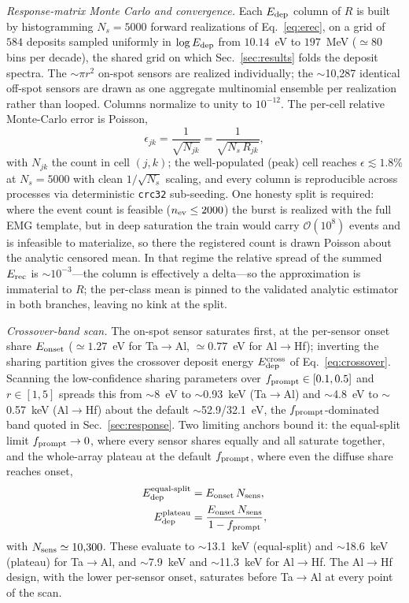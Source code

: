 \emph{Response-matrix Monte Carlo and convergence.} Each $E_{\rm dep}$ column of $R$ is built by histogramming $N_s=5000$ forward realizations of Eq.~\eqref{eq:erec}, on a grid of $584$ deposits sampled uniformly in $\log E_{\rm dep}$ from $10.14$~eV to $197$~MeV ($\simeq$80 bins per decade), the shared grid on which Sec.~\ref{sec:results} folds the deposit spectra. The $\sim\pi r^2$ on-spot sensors are realized individually; the $\sim$10,287 identical off-spot sensors are drawn as one aggregate multinomial ensemble per realization rather than looped. Columns normalize to unity to $10^{-12}$. The per-cell relative Monte-Carlo error is Poisson,
\begin{equation}
\epsilon_{jk}=\frac{1}{\sqrt{N_{jk}}}=\frac{1}{\sqrt{N_s\,R_{jk}}},
\label{eq:mc-converge}
\end{equation}
with $N_{jk}$ the count in cell $(j,k)$; the well-populated (peak) cell reaches $\epsilon\lesssim1.8\%$ at $N_s=5000$ with clean $1/\sqrt{N_s}$ scaling, and every column is reproducible across processes via deterministic \texttt{crc32} sub-seeding. One honesty split is required: where the event count is feasible ($n_{\rm ev}\le2000$) the burst is realized with the full EMG template, but in deep saturation the train would carry $\mathcal{O}(10^8)$ events and is infeasible to materialize, so there the registered count is drawn Poisson about the analytic censored mean. In that regime the relative spread of the summed $E_{\rm rec}$ is $\sim10^{-3}$---the column is effectively a delta---so the approximation is immaterial to $R$; the per-class mean is pinned to the validated analytic estimator in both branches, leaving no kink at the split.

\emph{Crossover-band scan.} The on-spot sensor saturates first, at the per-sensor onset share $E_{\rm onset}$ ($\simeq1.27$~eV for Ta$\to$Al, $\simeq0.77$~eV for Al$\to$Hf); inverting the sharing partition gives the crossover deposit energy $E_{\rm dep}^{\rm cross}$ of Eq.~\eqref{eq:crossover}. Scanning the low-confidence sharing parameters over $f_{\rm prompt}\in[0.1,0.5]$ and $r\in[1,5]$ spreads this from $\sim$8~eV to $\sim$0.93~keV (Ta$\to$Al) and $\sim$4.8~eV to $\sim$0.57~keV (Al$\to$Hf) about the default $\sim$52.9/32.1~eV, the $f_{\rm prompt}$-dominated band quoted in Sec.~\ref{sec:response}. Two limiting anchors bound it: the equal-split limit $f_{\rm prompt}\to0$, where every sensor shares equally and all saturate together, and the whole-array plateau at the default $f_{\rm prompt}$, where even the diffuse share reaches onset,
\begin{align}
E_{\rm dep}^{\rm equal\text{-}split} &= E_{\rm onset}\,N_{\rm sens}, \nonumber\\
E_{\rm dep}^{\rm plateau} &= \frac{E_{\rm onset}\,N_{\rm sens}}{1-f_{\rm prompt}},
\label{eq:onset-band}
\end{align}
with $N_{\rm sens}\simeq10{,}300$. These evaluate to $\sim$13.1~keV (equal-split) and $\sim$18.6~keV (plateau) for Ta$\to$Al, and $\sim$7.9~keV and $\sim$11.3~keV for Al$\to$Hf. The Al$\to$Hf design, with the lower per-sensor onset, saturates before Ta$\to$Al at every point of the scan.
